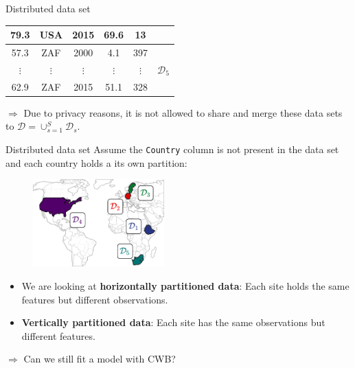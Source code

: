 \documentclass[t,10pt]{beamer}
\begin{document}
\begin{frame}{Distributed data set}
{\begin{table}
\begin{tabular}[t]{cccccc}
    79.3 & {\color{lightgray}USA} & 2015 & 69.6 & 13\\ \hline
    57.3 & {\color{lightgray}ZAF} & 2000 & 4.1 & 397 & \multirow{3}{*}{\color[HTML]{008280}\normalsize$\mathcal{D}_5$}\\
    {\tiny$\vdots$} & {\tiny\color{lightgray}$\vdots$} & {\tiny$\vdots$} & {\tiny$\vdots$} & {\tiny$\vdots$}\\
    62.9 & {\color{lightgray}ZAF} & 2015 & 51.1 & 328\\
  \bottomrule
  \end{tabular}
  \end{table}}
  $\Rightarrow$ Due to privacy reasons, it is not allowed to share and merge these data sets to $\mathcal{D} = \cup_{s=1}^S \mathcal{D}_s$.
\end{frame}

\begin{frame}{Distributed data set}
  Assume the \texttt{Country} column is not present in the data set and each country holds a its own partition:
  \vspace{-0.2cm}
  \begin{figure}
    \centering
    \includegraphics[width=0.45\textwidth]{figures/weltkarte.png}
  \end{figure}
  \vspace{-0.5cm}
  \begin{itemize}
    \item We are looking at \textbf{horizontally partitioned data}: Each site holds the same features but different observations.
    \item \textbf{Vertically partitioned data}: Each site has the same observations but different features.
  \end{itemize}
  $\Rightarrow$ Can we still fit a model with CWB?
\end{frame}
\end{document}
